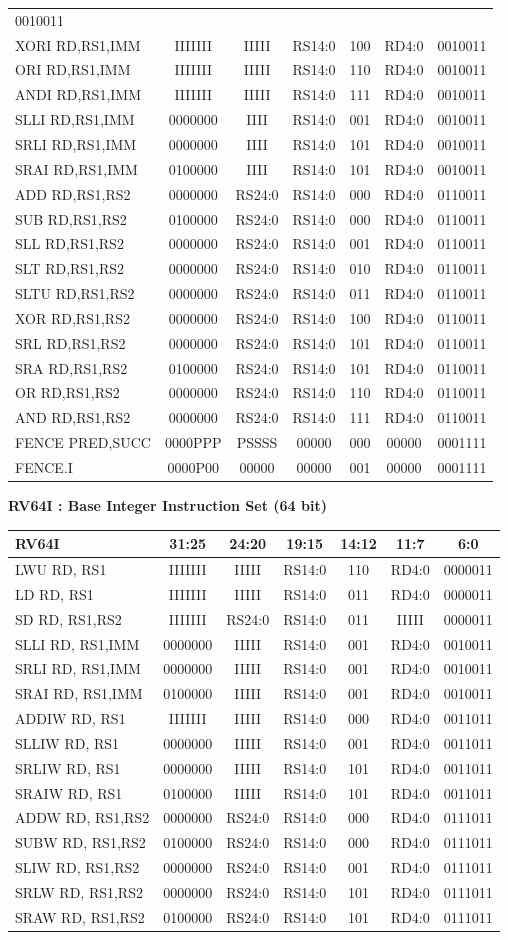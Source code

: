 \documentclass[
]{article}
\begin{document}
\begin{longtable}[]{@{}lcccccc@{}}
0010011\tabularnewline
XORI RD,RS1,IMM & IIIIIII & IIIII & RS14:0 & 100 & RD4:0 &
0010011\tabularnewline
ORI RD,RS1,IMM & IIIIIII & IIIII & RS14:0 & 110 & RD4:0 &
0010011\tabularnewline
ANDI RD,RS1,IMM & IIIIIII & IIIII & RS14:0 & 111 & RD4:0 &
0010011\tabularnewline
SLLI RD,RS1,IMM & 0000000 & IIII & RS14:0 & 001 & RD4:0 &
0010011\tabularnewline
SRLI RD,RS1,IMM & 0000000 & IIII & RS14:0 & 101 & RD4:0 &
0010011\tabularnewline
SRAI RD,RS1,IMM & 0100000 & IIII & RS14:0 & 101 & RD4:0 &
0010011\tabularnewline
ADD RD,RS1,RS2 & 0000000 & RS24:0 & RS14:0 & 000 & RD4:0 &
0110011\tabularnewline
SUB RD,RS1,RS2 & 0100000 & RS24:0 & RS14:0 & 000 & RD4:0 &
0110011\tabularnewline
SLL RD,RS1,RS2 & 0000000 & RS24:0 & RS14:0 & 001 & RD4:0 &
0110011\tabularnewline
SLT RD,RS1,RS2 & 0000000 & RS24:0 & RS14:0 & 010 & RD4:0 &
0110011\tabularnewline
SLTU RD,RS1,RS2 & 0000000 & RS24:0 & RS14:0 & 011 & RD4:0 &
0110011\tabularnewline
XOR RD,RS1,RS2 & 0000000 & RS24:0 & RS14:0 & 100 & RD4:0 &
0110011\tabularnewline
SRL RD,RS1,RS2 & 0000000 & RS24:0 & RS14:0 & 101 & RD4:0 &
0110011\tabularnewline
SRA RD,RS1,RS2 & 0100000 & RS24:0 & RS14:0 & 101 & RD4:0 &
0110011\tabularnewline
OR RD,RS1,RS2 & 0000000 & RS24:0 & RS14:0 & 110 & RD4:0 &
0110011\tabularnewline
AND RD,RS1,RS2 & 0000000 & RS24:0 & RS14:0 & 111 & RD4:0 &
0110011\tabularnewline
FENCE PRED,SUCC & 0000PPP & PSSSS & 00000 & 000 & 00000 &
0001111\tabularnewline
FENCE.I & 0000P00 & 00000 & 00000 & 001 & 00000 & 0001111\tabularnewline
\bottomrule
\end{longtable}

\textbf{RV64I : Base Integer Instruction Set (64 bit)}

\begin{longtable}[]{@{}lcccccc@{}}
\toprule
RV64I & 31:25 & 24:20 & 19:15 & 14:12 & 11:7 & 6:0\tabularnewline
\midrule
\endhead
LWU RD, RS1 & IIIIIII & IIIII & RS14:0 & 110 & RD4:0 &
0000011\tabularnewline
LD RD, RS1 & IIIIIII & IIIII & RS14:0 & 011 & RD4:0 &
0000011\tabularnewline
SD RD, RS1,RS2 & IIIIIII & RS24:0 & RS14:0 & 011 & IIIII &
0000011\tabularnewline
SLLI RD, RS1,IMM & 0000000 & IIIII & RS14:0 & 001 & RD4:0 &
0010011\tabularnewline
SRLI RD, RS1,IMM & 0000000 & IIIII & RS14:0 & 001 & RD4:0 &
0010011\tabularnewline
SRAI RD, RS1,IMM & 0100000 & IIIII & RS14:0 & 001 & RD4:0 &
0010011\tabularnewline
ADDIW RD, RS1 & IIIIIII & IIIII & RS14:0 & 000 & RD4:0 &
0011011\tabularnewline
SLLIW RD, RS1 & 0000000 & IIIII & RS14:0 & 001 & RD4:0 &
0011011\tabularnewline
SRLIW RD, RS1 & 0000000 & IIIII & RS14:0 & 101 & RD4:0 &
0011011\tabularnewline
SRAIW RD, RS1 & 0100000 & IIIII & RS14:0 & 101 & RD4:0 &
0011011\tabularnewline
ADDW RD, RS1,RS2 & 0000000 & RS24:0 & RS14:0 & 000 & RD4:0 &
0111011\tabularnewline
SUBW RD, RS1,RS2 & 0100000 & RS24:0 & RS14:0 & 000 & RD4:0 &
0111011\tabularnewline
SLIW RD, RS1,RS2 & 0000000 & RS24:0 & RS14:0 & 001 & RD4:0 &
0111011\tabularnewline
SRLW RD, RS1,RS2 & 0000000 & RS24:0 & RS14:0 & 101 & RD4:0 &
0111011\tabularnewline
SRAW RD, RS1,RS2 & 0100000 & RS24:0 & RS14:0 & 101 & RD4:0 &
0111011\tabularnewline
\bottomrule
\end{longtable}
\end{document}
